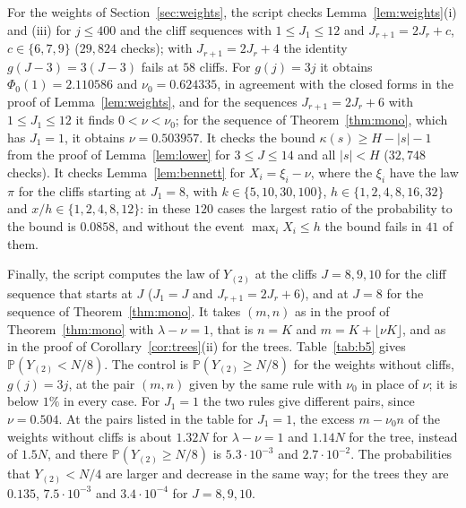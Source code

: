 \documentclass[11pt]{amsart}
\theoremstyle{remark}
\numberwithin{equation}{section}
\newcommand{\Pp}{\mathbb P}
\begin{document}
For the weights of Section~\ref{sec:weights}, the script checks Lemma~\ref{lem:weights}(i) and (iii) for $j\le400$ and the cliff sequences with $1\le J_1\le12$ and $J_{r+1}=2J_r+c$, $c\in\{6,7,9\}$ ($29{,}824$ checks); with $J_{r+1}=2J_r+4$ the identity $g(J-3)=3(J-3)$ fails at $58$ cliffs. For $g(j)=3j$ it obtains $\Phi_0(1)=2.110586$ and $\nu_0=0.624335$, in agreement with the closed forms in the proof of Lemma~\ref{lem:weights}, and for the sequences $J_{r+1}=2J_r+6$ with $1\le J_1\le12$ it finds $0<\nu<\nu_0$; for the sequence of Theorem~\ref{thm:mono}, which has $J_1=1$, it obtains $\nu=0.503957$. It checks the bound $\kappa(s)\ge H-|s|-1$ from the proof of Lemma~\ref{lem:lower} for $3\le J\le14$ and all $|s|<H$ ($32{,}748$ checks). It checks Lemma~\ref{lem:bennett} for $X_i=\xi_i-\nu$, where the $\xi_i$ have the law $\pi$ for the cliffs starting at $J_1=8$, with $k\in\{5,10,30,100\}$, $h\in\{1,2,4,8,16,32\}$ and $x/h\in\{1,2,4,8,12\}$: in these $120$ cases the largest ratio of the probability to the bound is $0.0858$, and without the event $\max_iX_i\le h$ the bound fails in $41$ of them.

Finally, the script computes the law of $Y_{(2)}$ at the cliffs $J=8,9,10$ for the cliff sequence that starts at $J$ ($J_1=J$ and $J_{r+1}=2J_r+6$), and at $J=8$ for the sequence of Theorem~\ref{thm:mono}. It takes $(m,n)$ as in the proof of Theorem~\ref{thm:mono} with $\lambda-\nu=1$, that is $n=K$ and $m=K+\lfloor\nu K\rfloor$, and as in the proof of Corollary~\ref{cor:trees}(ii) for the trees. Table~\ref{tab:b5} gives $\Pp(Y_{(2)}<N/8)$. The control is $\Pp(Y_{(2)}\ge N/8)$ for the weights without cliffs, $g(j)=3j$, at the pair $(m,n)$ given by the same rule with $\nu_0$ in place of $\nu$; it is below $1\%$ in every case. For $J_1=1$ the two rules give different pairs, since $\nu=0.504$. At the pairs listed in the table for $J_1=1$, the excess $m-\nu_0n$ of the weights without cliffs is about $1.32N$ for $\lambda-\nu=1$ and $1.14N$ for the tree, instead of $1.5N$, and there $\Pp(Y_{(2)}\ge N/8)$ is $5.3\cdot10^{-3}$ and $2.7\cdot10^{-2}$. The probabilities that $Y_{(2)}<N/4$ are larger and decrease in the same way; for the trees they are $0.135$, $7.5\cdot10^{-3}$ and $3.4\cdot10^{-4}$ for $J=8,9,10$.
\end{document}
